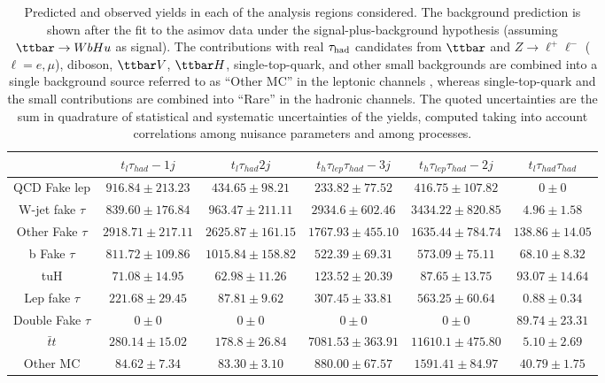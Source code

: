 \begin{table}[htbp]
\caption{
Predicted and observed yields in each of the analysis regions considered.
The background prediction is shown after the fit to the asimov data under the signal-plus-background hypothesis 
(assuming $\Hu$ as signal).
The contributions with real $\tau_{\mathrm{had}}$ candidates from $\ttbar$ and  $Z\to \ell^+\ell^-$ ($\ell = e, \mu$), diboson, $\ttbar V$, $\ttbar H$, single-top-quark, and other small backgrounds are combined into
a single background source referred to as ``Other MC'' in the leptonic channels , whereas single-top-quark and the small contributions are combined into ``Rare'' in the hadronic channels.
The quoted uncertainties are the sum in quadrature of statistical and systematic uncertainties of the yields, 
computed taking into account correlations among nuisance parameters and among processes.
}
\small
\centering
\begin{tabular}{|c|c|c|c|c|c|}
  \hline
 & $t_{l}\tau_{had}-1j$ & $t_{l}\tau_{had}2j$ & $t_{h}\tau_{lep}\tau_{had}-3j$ & $t_{h}\tau_{lep}\tau_{had}-2j$ & $t_{l}\tau_{had}\tau_{had}$\\
\hline
  QCD Fake lep   & $916.84 \pm 213.23$ & $434.65 \pm 98.21$ & $233.82 \pm 77.52$ & $416.75 \pm 107.82$ & $0 \pm 0$ \\
  W-jet fake $\tau$  & $839.60 \pm 176.84$ & $963.47 \pm 211.11$ & $2934.6 \pm 602.46$ & $3434.22 \pm 820.85$ & $4.96 \pm 1.58$ \\
  Other Fake $\tau$  & $2918.71 \pm 217.11$ & $2625.87 \pm 161.15$ & $1767.93 \pm 455.10$ & $1635.44 \pm 784.74$ & $138.86 \pm 14.05$ \\
  b Fake $\tau$  & $811.72 \pm 109.86$ & $1015.84 \pm 158.82$ & $522.39 \pm 69.31$ & $573.09 \pm 75.11$ & $68.10 \pm 8.32$ \\
  tuH   & $71.08 \pm 14.95$ & $62.98 \pm 11.26$ & $123.52 \pm 20.39$ & $87.65 \pm 13.75$ & $93.07 \pm 14.64$ \\                                                                                           
  Lep fake $\tau$  & $221.68 \pm 29.45$ & $87.81 \pm 9.62$ & $307.45 \pm 33.81$ & $563.25 \pm 60.64$ & $0.88 \pm 0.34$ \\
  Double Fake $\tau$  & $0 \pm 0$ & $0 \pm 0$ & $0 \pm 0$ & $0 \pm 0$ & $89.74 \pm 23.31$ \\
  $\bar{t}t$   & $280.14 \pm 15.02$ & $178.8 \pm 26.84$ & $7081.53 \pm 363.91$ & $11610.1 \pm 475.80$ & $5.10 \pm 2.69$ \\
  Other MC   & $84.62 \pm 7.34$ & $83.30 \pm 3.10$ & $880.00 \pm 67.57$ & $1591.41 \pm 84.97$ & $40.79 \pm 1.75$ \\

\end{tabular}
\end{table}
